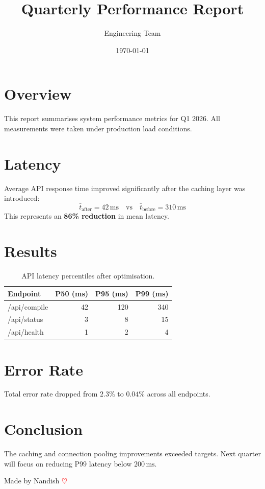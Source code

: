 \documentclass[12pt]{article}
\title{Quarterly Performance Report}
\author{Engineering Team}
\date{\today}
\begin{document}
\maketitle
\tableofcontents
\newpage

\section{Overview}
This report summarises system performance metrics for Q1 2026.
All measurements were taken under production load conditions.

\section{Latency}
Average API response time improved significantly after the caching layer was introduced:
\[
  \bar{t}_{\text{after}} = 42\,\text{ms} \quad \text{vs} \quad \bar{t}_{\text{before}} = 310\,\text{ms}
\]
This represents an \textbf{86\% reduction} in mean latency.

\section{Results}

\begin{table}[h]
\centering
\begin{tabular}{@{}lrrr@{}}
\toprule
\textbf{Endpoint}  & \textbf{P50 (ms)} & \textbf{P95 (ms)} & \textbf{P99 (ms)} \\
\midrule
/api/compile       & 42  & 120 & 340  \\
/api/status        & 3   & 8   & 15   \\
/api/health        & 1   & 2   & 4    \\
\bottomrule
\end{tabular}
\caption{API latency percentiles after optimisation.}
\end{table}

\section{Error Rate}
Total error rate dropped from $2.3\%$ to $0.04\%$ across all endpoints.

\section{Conclusion}
The caching and connection pooling improvements exceeded targets.
Next quarter will focus on reducing P99 latency below $200\,\text{ms}$.

\vfill
\begin{center}
  \small Made by Nandish \textcolor{red}{$\heartsuit$}
\end{center}
\end{document}

